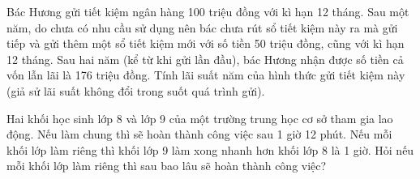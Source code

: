 \begin{exercises}
\begin{questions}[resume=SGK]
        \answerline
        \answerline
        \answerline

        \item Bác Hương gửi tiết kiệm ngân hàng 100 triệu đồng với kì hạn 12 tháng. Sau một năm, do chưa có nhu cầu sử dụng nên bác chưa rút sổ tiết kiệm này ra mà gửi tiếp và gửi thêm một sổ tiết kiệm mới với số tiền 50 triệu đồng, cũng với kì hạn 12 tháng. Sau hai năm (kể từ khi gửi lần đầu), bác Hương nhận được số tiền cả vốn lẫn lãi là 176 triệu đồng. Tính lãi suất năm của hình thức gửi tiết kiệm này (giả sử lãi suất không đổi trong suốt quá trình gửi).

        \answerline
        \answerline
        \answerline

        \item Hai khối học sinh lớp 8 và lớp 9 của một trường trung học cơ sở tham gia lao động. Nếu làm chung thì sẽ hoàn thành công việc sau 1 giờ 12 phút. Nếu mỗi khối lớp làm riêng thì khối lớp 9 làm xong nhanh hơn khối lớp 8 là 1 giờ. Hỏi nếu mỗi khối lớp làm riêng thì sau bao lâu sẽ hoàn thành công việc?

        \answerline
        \answerline
        \answerline
    \end{questions}
\end{exercises}

